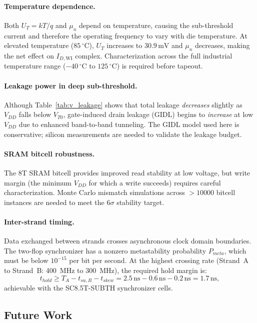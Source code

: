 \paragraph{Temperature dependence.}
Both $U_T = kT/q$ and $\mu_n$ depend on temperature, causing the sub-threshold current and
therefore the operating frequency to vary with die temperature.  At elevated temperature
($85\,^\circ\text{C}$), $U_T$ increases to $30.9\,\text{mV}$ and $\mu_n$ decreases, making
the net effect on $I_{D,\text{WI}}$ complex.  Characterization across the full
industrial temperature range ($-40\,^\circ\text{C}$ to $125\,^\circ\text{C}$) is required
before tapeout.

\paragraph{Leakage power in deep sub-threshold.}
Although Table~\ref{tab:v_leakage} shows that total leakage \emph{decreases} slightly as
$V_{DD}$ falls below $V_{T0}$, gate-induced drain leakage (GIDL) begins to \emph{increase}
at low $V_{DD}$ due to enhanced band-to-band tunneling.  The GIDL model used here is
conservative; silicon measurements are needed to validate the leakage budget.

\paragraph{SRAM bitcell robustness.}
The 8T SRAM bitcell provides improved read stability at low voltage, but write margin
(the minimum $V_{DD}$ for which a write succeeds) requires careful characterization.
Monte Carlo mismatch simulations across $> 10000$ bitcell instances are needed to meet
the $6\sigma$ stability target.

\paragraph{Inter-strand timing.}
Data exchanged between strands crosses asynchronous clock domain boundaries.  The
two-flop synchronizer has a nonzero metastability probability $P_{meta}$, which must be
below $10^{-15}$ per bit per second.  At the highest crossing rate (Strand~A to
Strand~B: 400~MHz to 300~MHz), the required hold margin is:
\[
  t_{hold} \geq T_{A} - t_{su,B} - t_{skew} = 2.5\,\text{ns} - 0.6\,\text{ns} - 0.2\,\text{ns} = 1.7\,\text{ns},
\]
achievable with the SC8.5T-SUBTH synchronizer cells.

\subsection{Future Work}

